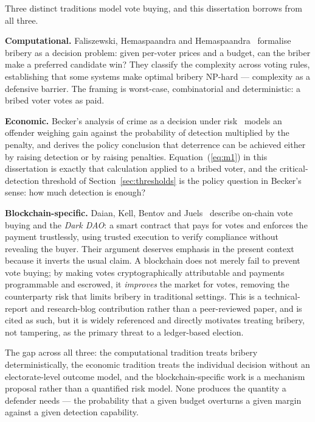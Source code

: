 Three distinct traditions model vote buying, and this dissertation
borrows from all three.

\textbf{Computational.} Faliszewski, Hemaspaandra and
Hemaspaandra~\cite{faliszewski2009} formalise bribery as a decision
problem: given per-voter prices and a budget, can the briber make a
preferred candidate win? They classify the complexity across voting
rules, establishing that some systems make optimal bribery
NP-hard --- complexity as a defensive barrier. The framing is
worst-case, combinatorial and deterministic: a bribed voter votes as
paid.

\textbf{Economic.} Becker's analysis of crime as a decision under
risk~\cite{becker1968} models an offender weighing gain against the
probability of detection multiplied by the penalty, and derives the
policy conclusion that deterrence can be achieved either by raising
detection or by raising penalties. Equation~(\ref{eq:m1}) in this
dissertation is exactly that calculation applied to a bribed voter, and
the critical-detection threshold of Section~\ref{sec:thresholds} is the
policy question in Becker's sense: how much detection is enough?

\textbf{Blockchain-specific.} Daian, Kell, Bentov and
Juels~\cite{daian2018} describe on-chain vote buying and the
\emph{Dark DAO}: a smart contract that pays for votes and enforces the
payment trustlessly, using trusted execution to verify compliance
without revealing the buyer. Their argument deserves emphasis in the
present context because it inverts the usual claim. A blockchain does
not merely fail to prevent vote buying; by making votes cryptographically
attributable and payments programmable and escrowed, it \emph{improves}
the market for votes, removing the counterparty risk that limits bribery
in traditional settings. This is a technical-report and research-blog
contribution rather than a peer-reviewed paper, and is cited as such,
but it is widely referenced and directly motivates treating bribery,
not tampering, as the primary threat to a ledger-based election.

The gap across all three: the computational tradition treats bribery
deterministically, the economic tradition treats the individual decision
without an electorate-level outcome model, and the blockchain-specific
work is a mechanism proposal rather than a quantified risk model. None
produces the quantity a defender needs --- the probability that a given
budget overturns a given margin against a given detection capability.

